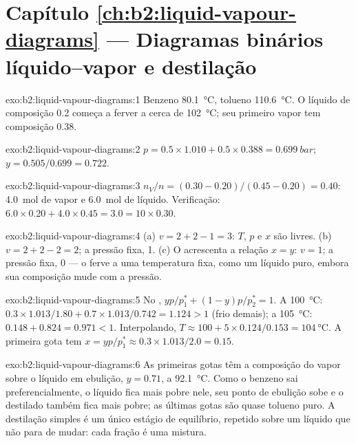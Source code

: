 \section*{Capítulo \ref{ch:b2:liquid-vapour-diagrams} --- Diagramas binários líquido--vapor e destilação}

\begin{solution}{exo:b2:liquid-vapour-diagrams:1}
Benzeno \qty{80.1}{\degreeCelsius}, tolueno \qty{110.6}{\degreeCelsius}. O líquido
de composição 0.2 começa a ferver a cerca de \qty{102}{\degreeCelsius}; seu primeiro
vapor tem composição 0.38.
\end{solution}

\begin{solution}{exo:b2:liquid-vapour-diagrams:2}
$p = 0.5 \times 1.010 + 0.5 \times 0.388 = \qty{0.699}{bar}$;
$y = 0.505/0.699 = 0.722$.
\end{solution}

\begin{solution}{exo:b2:liquid-vapour-diagrams:3}
$n_V/n = (0.30 - 0.20)/(0.45 - 0.20) = 0.40$: \qty{4.0}{mol} de vapor e
\qty{6.0}{mol} de líquido. Verificação: $6.0 \times 0.20 + 4.0 \times 0.45 = 3.0 = 10
\times 0.30$.
\end{solution}

\begin{solution}{exo:b2:liquid-vapour-diagrams:4}
(a) $v = 2 + 2 - 1 = 3$: $T$, $p$ e $x$ são livres. (b) $v = 2 + 2 - 2 = 2$; a
pressão fixa, 1. (c) O  acrescenta a relação $x = y$: $v = 1$; a pressão
fixa, 0 --- o  ferve a uma temperatura fixa, como um líquido puro,
embora sua composição mude com a pressão.
\end{solution}

\begin{solution}{exo:b2:liquid-vapour-diagrams:5}
No , $yp/p_1^* + (1 - y)p/p_2^* = 1$. A \qty{100}{\degreeCelsius}:
$0.3 \times 1.013/1.80 + 0.7 \times 1.013/0.742 = 1.124 > 1$ (frio demais); a
\qty{105}{\degreeCelsius}: $0.148 + 0.824 = 0.971 < 1$. Interpolando, $T \approx
100 + 5 \times 0.124/0.153 = \qty{104}{\degreeCelsius}$. A primeira gota tem $x =
yp/p_1^* \approx 0.3 \times 1.013/2.0 = 0.15$.
\end{solution}

\begin{solution}{exo:b2:liquid-vapour-diagrams:6}
As primeiras gotas têm a composição do vapor sobre o líquido em ebulição,
$y = 0.71$, a \qty{92.1}{\degreeCelsius}. Como o benzeno sai preferencialmente, o
líquido fica mais pobre nele, seu ponto de ebulição sobe e o destilado também
fica mais pobre; as últimas gotas são quase tolueno puro. A destilação simples
é um único estágio de equilíbrio, repetido sobre um líquido que não para de
mudar: cada fração é uma mistura.
\end{solution}

